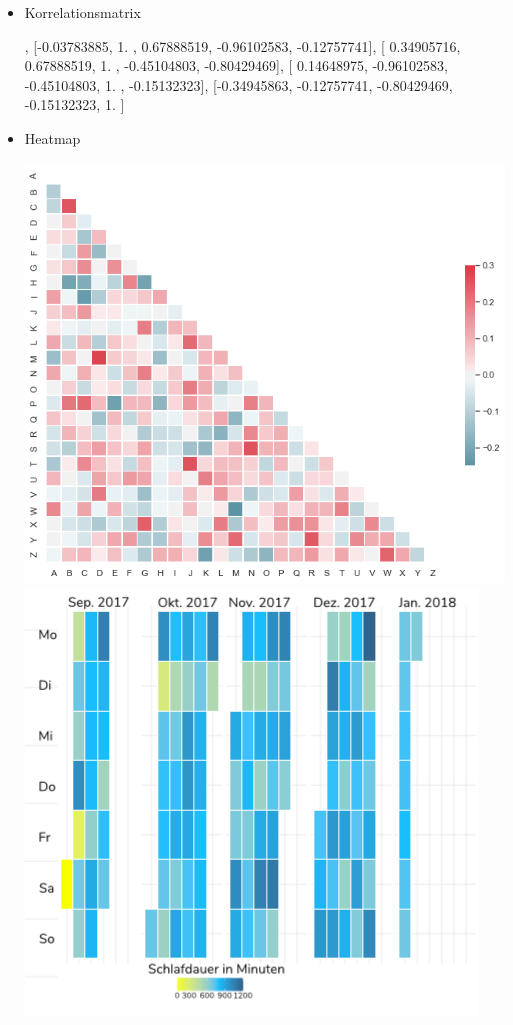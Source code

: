 \documentclass[
  12pt, %
  a4paper, %
  oneside, %
  openany, 
  numbers=noenddot, %
  BCOR=5mm, %
  parskip=half*, %
  thesis, %
]{bfhbook}
\begin{document}
\begin{itemize}
	\item Korrelationsmatrix
	
	\begin{minipage}[t]{0.45\linewidth}
		\begin{scriptsize}
		[ 1.        , -0.03783885,  0.34905716,  0.14648975, -0.34945863],
      [-0.03783885,  1.        ,  0.67888519, -0.96102583, -0.12757741],
      [ 0.34905716,  0.67888519,  1.        , -0.45104803, -0.80429469],
      [ 0.14648975, -0.96102583, -0.45104803,  1.        , -0.15132323],
      [-0.34945863, -0.12757741, -0.80429469, -0.15132323,  1.        ]
      \end{scriptsize}
	\end{minipage}\hfill
	\begin{minipage}[t]{0.45\linewidth}

	\end{minipage}
        
	\item Heatmap 
	
	\begin{minipage}[t]{0.45\linewidth}
		\vspace{0pt}
		\includegraphics[width=0.6\linewidth]{Bilder/many_pairwise_correlations.png}
            \vspace{10pt}
            \includegraphics[width=0.6\linewidth]{Bilder/heatmap-sleep.PNG}
	\end{minipage}
	\begin{minipage}[t]{0.45\linewidth}
	

\end{minipage}
\end{itemize}
\end{document}
